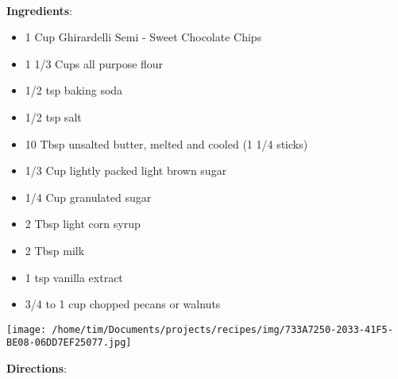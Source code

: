 \documentclass[11pt, twoside, openany]{book}
\begin{document}
 \label{crispy-crunchy-chocolate-chip-cookies}\hfill\textit{}\\
\begin{minipage}[t]{0.8\linewidth}
\textbf{Ingredients}:\vspace{-3mm}
\begin{multicols}{2}
\begin{itemize}\setlength\itemsep{-1mm}
\item 1 Cup Ghirardelli Semi - Sweet Chocolate Chips
\item 1 1/3 Cups all purpose flour
\item 1/2 tsp baking soda
\item 1/2 tsp salt
\item 10 Tbsp unsalted butter, melted and cooled (1 1/4 sticks)
\item 1/3 Cup lightly packed light brown sugar
\item 1/4 Cup granulated sugar
\item 2 Tbsp light corn syrup
\item 2 Tbsp milk
\item 1 tsp vanilla extract
\item 3/4 to 1 cup chopped pecans or walnuts
\end{itemize}
\end{multicols}
\end{minipage}
\begin{minipage}[t]{0.2\linewidth}
\centering \strut\vspace*{-\baselineskip}\newline
\texttt{[image: /home/tim/Documents/projects/recipes/img/733A7250-2033-41F5-BE08-06DD7EF25077.jpg]}\\
\end{minipage}\vspace{3mm}
\textbf{Directions}:
\end{document}
